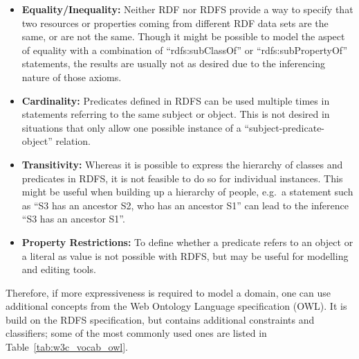 \begin{itemize}
	\item \textbf{Equality/Inequality:} Neither \gls{RDF} nor \gls{RDFS} provide a way to specify that two resources or properties coming from different \gls{RDF} data sets are the same, or are not the same. Though it might be possible to model the aspect of equality with a combination of ``rdfs:subClassOf'' or ``rdfs:subPropertyOf'' statements, the results are usually not as desired due to the inferencing nature of those axioms.
	\item \textbf{Cardinality:} Predicates defined in \gls{RDFS} can be used multiple times in statements referring to the same subject or object. This is not desired in situations that only allow one possible instance of a ``subject-predicate-object'' relation.
	\item \textbf{Transitivity:} Whereas it is possible to express the hierarchy of classes and predicates in \gls{RDFS}, it is not feasible to do so for individual instances. This might be useful when building up a hierarchy of people, e.g.\ a statement such as ``S3 has an ancestor S2, who has an ancestor S1'' can lead to the inference ``S3 has an ancestor S1''.
	\item \textbf{Property Restrictions:} To define whether a predicate refers to an object or a literal as value is not possible with \gls{RDFS}, but may be useful for modelling and editing tools.
\end{itemize}

Therefore, if more expressiveness is required to model a domain, one can use additional concepts from the Web Ontology Language specification (\gls{OWL}). It is build on the \gls{RDFS} specification, but contains additional constraints and classifiers; some of the most commonly used ones are listed in Table~\ref{tab:w3c_vocab_owl}. \@

